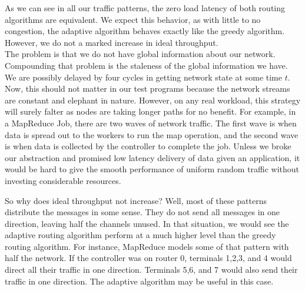 \documentclass[10pt]{article}
\begin{document}
As we can see in all our traffic patterns, the zero load latency of both
routing algorithms are equivalent. 
We expect this behavior, as with little to no congestion, the adaptive 
algorithm behaves exactly like the greedy algorithm. \\



However, we do not a marked increase in ideal throughput. \\

The problem is that we do not have global information about our network.
Compounding that problem is the staleness of the global information we have.
We are possibly delayed by four cycles in getting network state at some time
$t$. 
Now, this should not matter in our test programs because the network streams
are constant and elephant in nature. 
However, on any real workload, this strategy will surely falter as nodes 
are taking longer paths for no benefit.
For example, in a MapReduce Job, there are two waves of network traffic.
The first wave is when data is spread out to the workers to run the map
operation, and the second wave is when data is collected by the controller
to complete the job. 
Unless we broke our abstraction and promised low latency delivery of data
given an application, it would be hard to give the smooth performance of 
uniform random traffic without investing considerable resources. \par

So why does ideal throughput not increase?
Well, most of these patterns distribute the messages in some sense. 
They do not send all messages in one direction, leaving half the channels
unused.
In that situation, we would see the adaptive routing algorithm 
perform at a much higher level than the greedy routing algorithm.
For instance, MapReduce models some of that pattern with half the network.
If the controller was on router 0, terminals 1,2,3, and 4 would direct all 
their traffic in one direction. 
Terminals 5,6, and 7 would also send their traffic in one direction. 
The adaptive algorithm may be useful in this case. 
\end{document}

